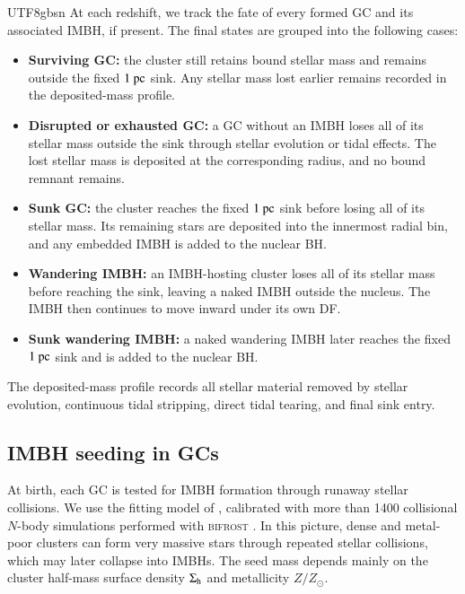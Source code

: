\documentclass[trackchanges, twocolappendix, twocolumn]{aastex701}
\begin{document}
\begin{CJK*}{UTF8}{gbsn}
At each redshift, we track the fate of every formed GC and its associated IMBH, if present. The final states are grouped into the following cases:
\begin{itemize}
\item \textbf{Surviving GC:} the cluster still retains bound stellar mass and remains outside the fixed $1~{\rm pc}$ sink. Any stellar mass lost earlier remains recorded in the deposited-mass profile.
\item \textbf{Disrupted or exhausted GC:} a GC without an IMBH loses all of its stellar mass outside the sink through stellar evolution or tidal effects. The lost stellar mass is deposited at the corresponding radius, and no bound remnant remains.
\item \textbf{Sunk GC:} the cluster reaches the fixed $1~{\rm pc}$ sink before losing all of its stellar mass. Its remaining stars are deposited into the innermost radial bin, and any embedded IMBH is added to the nuclear BH.
\item \textbf{Wandering IMBH:} an IMBH-hosting cluster loses all of its stellar mass before reaching the sink, leaving a naked IMBH outside the nucleus. The IMBH then continues to move inward under its own DF.
\item \textbf{Sunk wandering IMBH:} a naked wandering IMBH later reaches the fixed $1~{\rm pc}$ sink and is added to the nuclear BH.
\end{itemize}
The deposited-mass profile records all stellar material removed by stellar evolution, continuous tidal stripping, direct tidal tearing, and final sink entry.

\subsection{IMBH seeding in GCs} \label{subsect:IMBH}

At birth, each GC is tested for IMBH formation through runaway stellar collisions. We use the fitting model of \cite{Rantala+2024FROST, Rantala+2025FROST, Rantala+2026FROST}, calibrated with more than 1400 collisional $N$-body simulations performed with \textsc{bifrost} \citep{Rantala+2021FROST, Rantala+2023BIFROST}. In this picture, dense and metal-poor clusters can form very massive stars through repeated stellar collisions, which may later collapse into IMBHs. The seed mass depends mainly on the cluster half-mass surface density $\Sigma_{\rm h}$ and metallicity $Z / Z_\odot$.


\end{CJK*}
\end{document}
